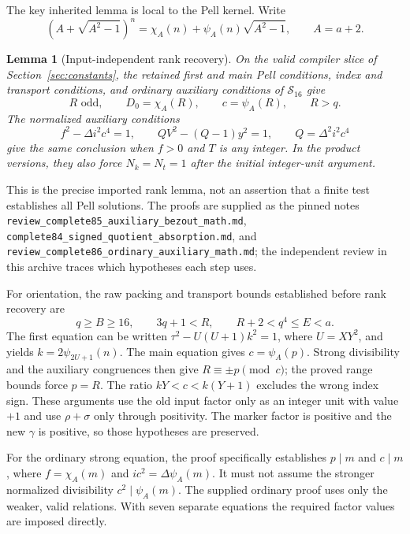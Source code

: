 \documentclass[11pt,a4paper]{article}
\newtheorem{lemma}[theorem]{Lemma}
\theoremstyle{remark}
\newcommand{\code}[1]{\nolinkurl{#1}}
\newcommand{\nk}{N_k}
\newcommand{\nt}{N_t}
\begin{document}
The key inherited lemma is local to the Pell kernel. Write
\[
 (A+\sqrt{A^2-1})^n=\chi_A(n)+\psi_A(n)\sqrt{A^2-1},\qquad A=a+2.
\]

\begin{lemma}[Input-independent rank recovery]
\label{lem:rank}
On the valid compiler slice of Section~\ref{sec:constants}, the retained
first and main Pell conditions, index and transport conditions, and
ordinary auxiliary conditions of $\mathcal S_{16}$ give
\begin{equation}
 R\text{ odd},\qquad D_0=\chi_A(R),\qquad c=\psi_A(R),
 \qquad R>q.
\label{eq:rank}
\end{equation}
The normalized auxiliary conditions
\begin{equation}
 f^2-\Delta i^2c^4=1,\qquad
 QV^2-(Q-1)y^2=1,\qquad Q=\Delta^2i^2c^4
\label{eq:normalized}
\end{equation}
give the same conclusion when $f>0$ and $T$ is any integer. In the
product versions, they also force $\nk=\nt=1$ after the initial
integer-unit argument.
\end{lemma}

This is the precise imported rank lemma, not an assertion that a finite
test establishes all Pell solutions. The proofs are supplied as the
pinned notes \code{review_complete85_auxiliary_bezout_math.md},
\code{complete84_signed_quotient_absorption.md}, and
\code{review_complete86_ordinary_auxiliary_math.md}; the independent
review in this archive traces which hypotheses each step uses.

For orientation, the raw packing and transport bounds established before
rank recovery are
\begin{equation}
 q\ge B\ge16,\qquad 3q+1<R,\qquad R+2<q^4\le E<a.
\label{eq:rawbounds}
\end{equation}
The first equation can be written
$\tau^2-U(U+1)k^2=1$, where $U=XY^2$, and yields
$k=2\psi_{2U+1}(n)$. The main equation gives
$c=\psi_A(p)$. Strong divisibility and the auxiliary congruences
then give $R\equiv\pm p\pmod c$; the proved range bounds force
$p=R$. The ratio $kY<c<k(Y+1)$ excludes the wrong index sign.
These arguments use the old input factor only as an integer unit with
value $+1$ and use $\rho+\sigma$ only through positivity. The marker
factor is positive and the new $\gamma$ is positive, so those hypotheses
are preserved.

For the ordinary strong equation, the proof specifically establishes
$p\mid m$ and $c\mid m$, where
$f=\chi_A(m)$ and $ic^2=\Delta\psi_A(m)$. It must not assume the
stronger normalized divisibility $c^2\mid\psi_A(m)$. The supplied
ordinary proof uses only the weaker, valid relations. With seven
separate equations the required factor values are imposed directly.
\end{document}
